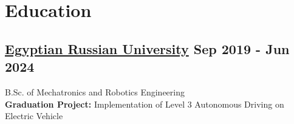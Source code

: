 \section*{Education}
%
%
%
\subsection*{
  \href{https://www.eru.edu.eg/}{Egyptian Russian University}
  \hspace*{\fill}
  \dateformat Sep 2019 - Jun 2024
}
B.Sc. of Mechatronics and Robotics Engineering\\
\textbf{Graduation Project:} Implementation of Level 3 Autonomous Driving on Electric Vehicle
